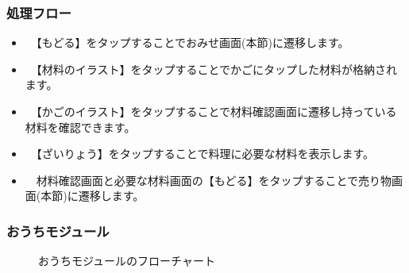 \documentclass[a4j]{jarticle}
\begin{document}
\subsubsection*{処理フロー}
\begin{itemize}
\item　【もどる】をタップすることでおみせ画面(本節)に遷移します。
\item　【材料のイラスト】をタップすることでかごにタップした材料が格納されます。
\item　【かごのイラスト】をタップすることで材料確認画面に遷移し持っている材料を確認できます。
\item　【ざいりょう】をタップすることで料理に必要な材料を表示します。
\item　材料確認画面と必要な材料画面の【もどる】をタップすることで売り物画面(本節)に遷移します。
\end{itemize}

\newpage
\subsubsection{おうちモジュール\label{おうち}}
\begin{figure}[H]
    \begin{center}
    \caption {おうちモジュールのフローチャート}
    \label{outi}
    \end{center}
\end{figure}
\end{document}
